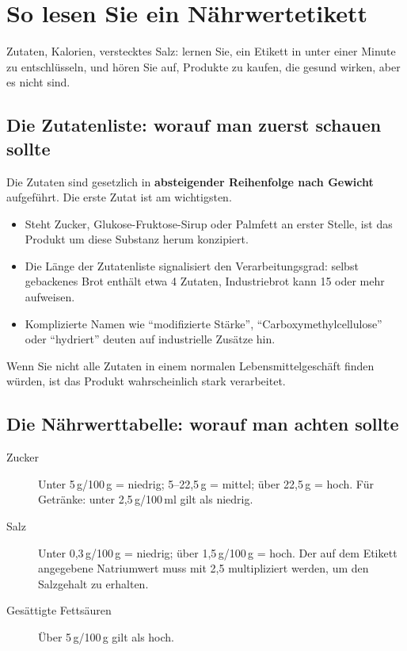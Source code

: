 \documentclass[a5paper,12pt,oneside,openany]{book}
\newcommand{\boxinfo}[2]{%
  \begin{tcolorbox}[kastenbase,
    colback=blauinfo!8!white, colframe=blauinfo, title={#1}]
  #2\end{tcolorbox}}
\begin{document}
\chapter{So lesen Sie ein N\"{a}hrwertetikett}

Zutaten, Kalorien, verstecktes Salz: lernen Sie, ein Etikett in unter einer
Minute zu entschl\"{u}sseln, und h\"{o}ren Sie auf, Produkte zu kaufen, die
gesund wirken, aber es nicht sind.

\section{Die Zutatenliste: worauf man zuerst schauen sollte}

Die Zutaten sind gesetzlich in \textbf{absteigender Reihenfolge nach Gewicht}
aufgef\"{u}hrt. Die erste Zutat ist am wichtigsten.

\begin{itemize}
  \item Steht Zucker, Glukose-Fruktose-Sirup oder Palmfett an erster Stelle,
    ist das Produkt um diese Substanz herum konzipiert.
  \item Die L\"{a}nge der Zutatenliste signalisiert den Verarbeitungsgrad:
    selbst gebackenes Brot enth\"{a}lt etwa 4 Zutaten, Industriebrot
    kann 15 oder mehr aufweisen.
  \item Komplizierte Namen wie ``modifizierte St\"{a}rke'',
    ``Carboxymethylcellulose'' oder ``hydriert'' deuten auf industrielle
    Zus\"{a}tze hin.
\end{itemize}

\boxinfo{Faustregel}{Wenn Sie nicht alle Zutaten in einem normalen
Lebensmittelgesch\"{a}ft finden w\"{u}rden, ist das Produkt wahrscheinlich
stark verarbeitet.}

\section{Die N\"{a}hrwerttabelle: worauf man achten sollte}

\begin{description}
  \item[Zucker] Unter 5\,g/100\,g = niedrig; 5--22,5\,g = mittel; \"{u}ber
    22,5\,g = hoch. F\"{u}r Getr\"{a}nke: unter 2,5\,g/100\,ml gilt als
    niedrig.
  \item[Salz] Unter 0,3\,g/100\,g = niedrig; \"{u}ber 1,5\,g/100\,g = hoch.
    Der auf dem Etikett angegebene Natriumwert muss mit 2,5 multipliziert
    werden, um den Salzgehalt zu erhalten.
  \item[Ges\"{a}ttigte Fetts\"{a}uren] \"{U}ber 5\,g/100\,g gilt als hoch.
\end{description}
\end{document}
